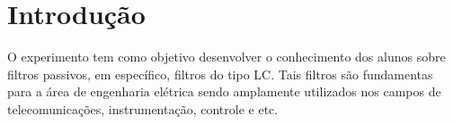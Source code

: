 \newpage

\section{Introdução}
O experimento tem como objetivo desenvolver o conhecimento dos alunos sobre filtros passivos, em específico, filtros do tipo LC. Tais filtros são fundamentas para a área de engenharia elétrica sendo amplamente utilizados nos campos de telecomunicações, instrumentação, controle e etc.